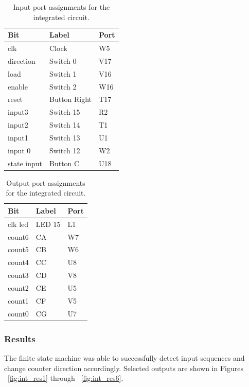 \documentclass[11pt]{article}
\begin{document}
\begin{table}[H]
\begin{center}
\begin{tabular}{| l | l | l |}
	\hline
	Bit & Label & Port \\ \hline
	clk &  Clock & W5 \\ \hline
	direction & Switch 0 & V17 \\ \hline
	load & Switch 1 & V16 \\ \hline
	enable & Switch 2 & W16 \\ \hline
	reset & Button Right & T17 \\ \hline
	input3 & Switch 15 & R2 \\ \hline
	input2 & Switch 14 & T1 \\ \hline
	input1 & Switch 13 & U1 \\ \hline
	input 0 & Switch 12 & W2 \\ \hline
	state input & Button C & U18 \\ \hline
\end{tabular}
\caption{\label{tab:integration_input_Ports}Input port assignments for  the integrated circuit.}
\end{center}
\end{table}

\begin{table}[H]
\begin{center}
\begin{tabular}{| l | l | l |}
	\hline
	Bit & Label & Port \\ \hline
	clk led & LED 15 & L1 \\ \hline
	count6 & CA & W7 \\ \hline
	count5 & CB & W6 \\ \hline
	count4 & CC & U8 \\ \hline
	count3 & CD & V8 \\ \hline
	count2 & CE & U5 \\ \hline
	count1 & CF & V5 \\ \hline
	count0 & CG & U7 \\ \hline
\end{tabular}
\caption{\label{tab:integration_output_Ports}Output port assignments for the integrated circuit.}
\end{center}
\end{table}

\subsubsection{Results}
The finite state machine was able to successfully detect input sequences and change counter direction accordingly. Selected outputs are shown in Figures ~\ref{fig:int_res1} through ~\ref{fig:int_res6}.
\end{document}
